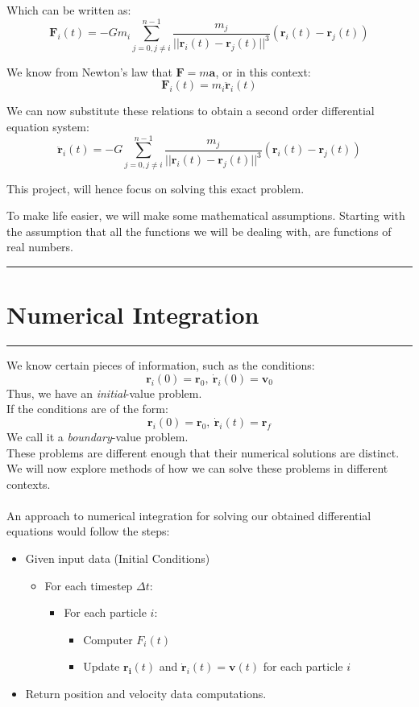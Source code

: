 \documentclass[hidelinks, 11pt, dvipsnames]{article}
\newcommand{\psection}[1]{{
    \begin{center}
        \noindent \rule{17cm}{0.4pt}
            \section*{\LARGE #1}
        \noindent \rule{17cm}{0.4pt}
    \end{center}
}}
\begin{document}
Which can be written as:
$$ \mathbf{F}_i(t) = -Gm_i \sum_{j=0, j\ne i}^{n-1} \frac{ m_j}{|| \mathbf{r}_i(t) - \mathbf{r}_j(t) ||^3}(\mathbf{r}_i(t) - \mathbf{r}_j(t)) $$

We know from Newton's law that $\mathbf{F} = m\mathbf{a}$, or in this context:
$$ \mathbf{F}_i(t) = m_i\mathbf{\ddot{r}}_i(t) $$

We can now substitute these relations to obtain a second order differential equation system:
$$ \mathbf{\ddot{r}}_i(t) = -G \sum_{j=0, j\ne i}^{n-1} \frac{ m_j}{|| \mathbf{r}_i(t) - \mathbf{r}_j(t) ||^3}(\mathbf{r}_i(t) - \mathbf{r}_j(t)) $$

This project, will hence focus on solving this exact problem.

To make life easier, we will make some mathematical assumptions. Starting with the assumption that all the functions we will be dealing with, are functions of real numbers.

\newpage

\psection{Numerical Integration}

We know certain pieces of information, such as the conditions:
$$ \mathbf{r}_i(0) = \mathbf{r}_0,\ \mathbf{\dot{r}}_i(0) = \mathbf{v}_0 $$
Thus, we have an \emph{initial}-value problem. \\

If the conditions are of the form:
$$ \mathbf{r}_i(0) = \mathbf{r}_0,\ \mathbf{\dot{r}}_i(t) = \mathbf{r}_f $$
We call it a \emph{boundary}-value problem.\\

These problems are different enough that their numerical solutions are distinct.\\

We will now explore methods of how we can solve these problems in different contexts.\\
\\

An approach to numerical integration for solving our obtained differential equations would follow the steps:
\begin{itemize}
    \item Given input data (Initial Conditions)
    \begin{itemize}
        \item For each timestep $\Delta t$:
        \begin{itemize}
            \item For each particle $i$:
            \begin{itemize}
                \item Computer $F_i(t)$
                \item Update $\mathbf{r_i}(t)$ and $\mathbf{\dot{r}}_i(t) = \mathbf{v}(t)$ for each particle $i$
            \end{itemize}
        \end{itemize}
    \end{itemize}
    \item Return position and velocity data computations.
\end{itemize}
\newpage
\end{document}
